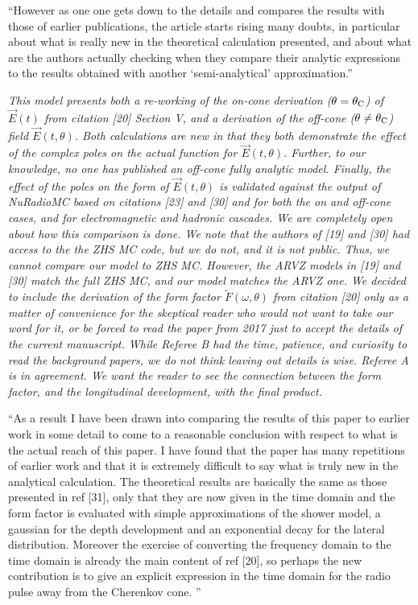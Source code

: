 \documentclass[12pt]{article}
\begin{document}
``However as one one gets down to the details and compares the results with those of earlier publications, the article starts rising many doubts, in particular about what is really new in the theoretical calculation presented, and about what are the authors actually checking when they compare their analytic expressions to the results obtained with another `semi-analytical' approximation.''

\textit{This model presents both a re-working of the on-cone derivation ($\theta = \theta_{\rm C}$) of $\vec{E}(t)$ from citation [20] Section V, and a derivation of the off-cone ($\theta \neq \theta_{\rm C}$) field $\vec{E}(t,\theta)$.  Both calculations are new in that they both demonstrate the effect of the complex poles on the actual function for $\vec{E}(t,\theta)$.  Further, to our knowledge, no one has published an off-cone fully analytic model.  Finally, the effect of the poles on the form of $\vec{E}(t,\theta)$ is validated against the output of NuRadioMC based on citations [23] and [30] and for both the on and off-cone cases, and for electromagnetic and hadronic cascades.  We are completely open about how this comparison is done.  We note that the authors of [19] and [30] had access to the the ZHS MC code, but we do not, and it is not public.  Thus, we cannot compare our model to ZHS MC.  However, the ARVZ models in [19] and [30] match the full ZHS MC, and our model matches the ARVZ one.  We decided to include the derivation of the form factor $\widetilde{F}(\omega,\theta)$ from citation [20] only as a matter of convenience for the skeptical reader who would not want to take our word for it, or be forced to read the paper from 2017 just to accept the details of the current manuscript.  While Referee B had the time, patience, and curiosity to read the background papers, we do not think leaving out details is wise.  Referee A is in agreement.  We want the reader to see the connection between the form factor, and the longitudinal development, with the final product.}

``As a result I have been drawn into comparing the results of this paper to earlier work in some detail to come to a reasonable conclusion with respect to what is the actual reach of this paper. I have found that the paper has many repetitions of earlier work and that it is extremely difficult to say what is truly new in the analytical calculation. The theoretical results are basically the same as those presented in ref [31], only that they are now given in the time domain and the form factor is evaluated with simple approximations of the shower model, a gaussian for the depth development and an exponential decay for the lateral distribution. Moreover the exercise of converting the frequency domain to the time domain is already the main content of ref [20], so perhaps the new contribution is to give an explicit expression in the time domain for the radio pulse away from the Cherenkov cone. ''
\end{document}
